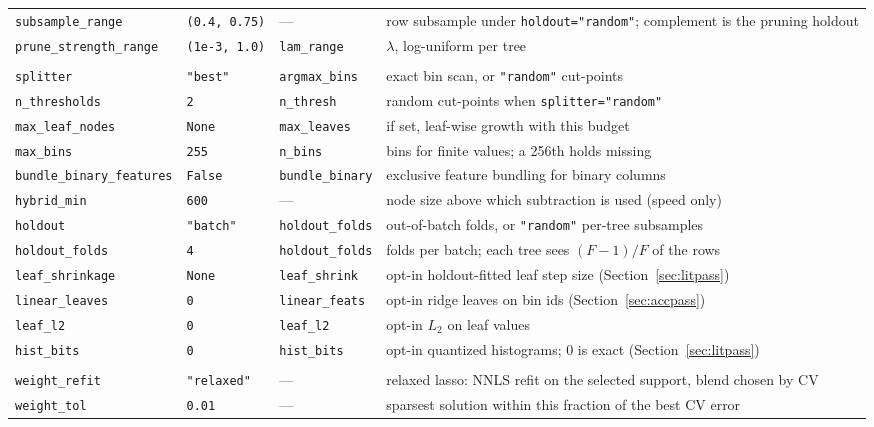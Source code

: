 \documentclass[11pt,a4paper]{article}
\newcommand{\code}[1]{\texttt{\small #1}}
\theoremstyle{definition}
\begin{document}
\begin{center}
\begin{tabular}{lllp{}}
\code{subsample\_range} & \code{(0.4, 0.75)} & --- & row subsample under \code{holdout="random"}; complement is the pruning holdout \\
\code{prune\_strength\_range} & \code{(1e-3, 1.0)} & \code{lam\_range} & $\lambda$, log-uniform per tree \\
\addlinespace
\multicolumn{4}{l}{\emph{Tree construction}} \\
\code{splitter} & \code{"best"} & \code{argmax\_bins} & exact bin scan, or \code{"random"} cut-points \\
\code{n\_thresholds} & \code{2} & \code{n\_thresh} & random cut-points when \code{splitter="random"} \\
\code{max\_leaf\_nodes} & \code{None} & \code{max\_leaves} & if set, leaf-wise growth with this budget \\
\code{max\_bins} & \code{255} & \code{n\_bins} & bins for finite values; a 256th holds missing \\
\code{bundle\_binary\_features} & \code{False} & \code{bundle\_binary} & exclusive feature bundling for binary columns \\
\code{hybrid\_min} & \code{600} & --- & node size above which subtraction is used (speed only) \\
\code{holdout} & \code{"batch"} & \code{holdout\_folds} & out-of-batch folds, or \code{"random"} per-tree subsamples \\
\code{holdout\_folds} & \code{4} & \code{holdout\_folds} & folds per batch; each tree sees $(F-1)/F$ of the rows \\
\code{leaf\_shrinkage} & \code{None} & \code{leaf\_shrink} & opt-in holdout-fitted leaf step size (Section~\ref{sec:litpass}) \\
\code{linear\_leaves} & \code{0} & \code{linear\_feats} & opt-in ridge leaves on bin ids (Section~\ref{sec:accpass}) \\
\code{leaf\_l2} & \code{0} & \code{leaf\_l2} & opt-in $L_2$ on leaf values \\
\code{hist\_bits} & \code{0} & \code{hist\_bits} & opt-in quantized histograms; 0 is exact (Section~\ref{sec:litpass}) \\
\addlinespace
\multicolumn{4}{l}{\emph{Weight fit and output}} \\
\code{weight\_refit} & \code{"relaxed"} & --- & relaxed lasso: NNLS refit on the selected support, blend chosen by CV \\
\code{weight\_tol} & \code{0.01} & --- & sparsest solution within this fraction of the best CV error \\

\end{tabular}
\end{center}
\end{document}
